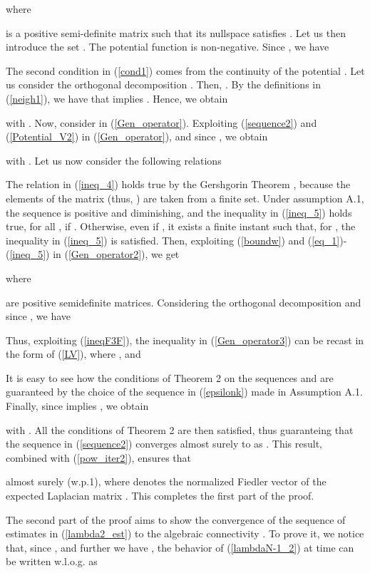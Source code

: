 \documentclass[10pt,twocolumn]{IEEEtran}
\begin{document}
where

is a positive semi-definite matrix such that its nullspace satisfies . Let us then introduce the set . The potential function  is non-negative. Since , we have

The second condition in (\ref{cond1}) comes from the continuity of the potential . Let us consider the orthogonal decomposition . Then, . By the definitions in (\ref{neigh1}), we have that  implies . Hence, we obtain

with . Now, consider  in (\ref{Gen_operator}). Exploiting (\ref{sequence2}) and (\ref{Potential_V2}) in (\ref{Gen_operator}), and since , we obtain

with . Let us now consider the following relations

The relation in (\ref{ineq_4}) holds true by the Gershgorin Theorem \cite{Horn-Johnson}, because the elements of the matrix  (thus, ) are taken from a finite set. Under assumption A.1, the sequence  is positive and diminishing, and the inequality in (\ref{ineq_5}) holds true, for all , if . Otherwise, even if , it exists a finite instant  such that, for , the inequality in (\ref{ineq_5}) is satisfied. Then, exploiting (\ref{boundw}) and (\ref{eq_1})-(\ref{ineq_5}) in (\ref{Gen_operator2}), we get

where

are positive semidefinite matrices. Considering the orthogonal decomposition  and since , we have

Thus, exploiting (\ref{ineqF3F}), the inequality in (\ref{Gen_operator3}) can be recast in the form of (\ref{LV}), where , and

It is easy to see how the conditions of Theorem 2 on the sequences  and  are guaranteed by the choice of the sequence  in (\ref{epsilonk}) made in Assumption A.1. Finally, since
 implies , we obtain

with . All the conditions of Theorem 2 are then satisfied, thus guaranteing that the sequence  in (\ref{sequence2}) converges almost surely to  as . This result, combined with (\ref{pow_iter2}), ensures that

almost surely (w.p.1), where  denotes the normalized Fiedler vector of the expected Laplacian matrix .
This completes the first part of the proof.


The second part of the proof aims to show the convergence of the sequence of estimates  in (\ref{lambda2_est}) to the algebraic connectivity . To prove it, we notice that, since , and further we have , the behavior of (\ref{lambdaN-1_2}) at time  can be written w.l.o.g. as
\end{document}
